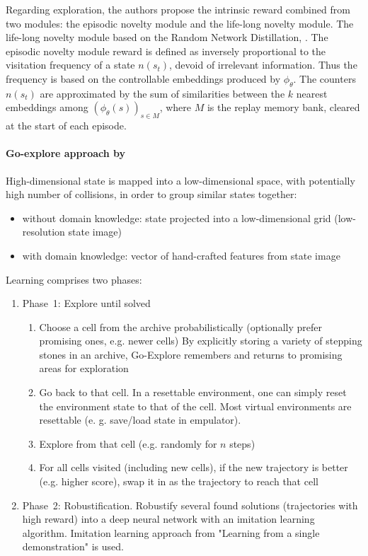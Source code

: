 \documentclass[acmsmall, nonacm]{acmart}
\begin{document}
Regarding exploration, the authors propose the intrinsic reward combined from two modules: the episodic novelty module and the life-long novelty module.
%
The life-long novelty module based on the Random Network Distillation, \citep{burda_exploration_2019}.
%
The episodic novelty module reward is defined as inversely proportional to the visitation frequency of a state $n(s_t)$, devoid of irrelevant information. Thus the frequency is based on the controllable embeddings produced by $\phi_\theta$.
The counters $n(s_t)$ are approximated by the sum of similarities between the $k$ nearest embeddings among  $(\phi_\theta(s))_{s\in M}$, where $M$ is the replay memory bank, cleared at the start of each episode.


\paragraph{Go-explore approach by~\citet{ecoffet_first_2021}} %
\label{par:go-explore}

High-dimensional state is mapped into a low-dimensional space, with potentially high number of collisions, in order to group similar states together:
\begin{itemize}
    \item without domain knowledge: state projected into a low-dimensional grid (low-resolution state image)
    \item with domain knowledge: vector of hand-crafted features from state image
\end{itemize}

Learning comprises two phases:
\begin{enumerate}
    \item Phase~1: Explore until solved
    \begin{enumerate}
      \item Choose a cell from the archive probabilistically (optionally prefer promising ones, e.g. newer cells)
    By explicitly storing a variety of stepping stones in an archive, Go-Explore remembers and returns to promising areas for exploration
      \item Go back to that cell. In a resettable environment, one can simply reset the environment state to that of the cell. Most virtual environments are resettable (e. g. save/load state in empulator).
      \item Explore from that cell (e.g. randomly for $n$ steps)
      \item For all cells visited (including new cells), if the new trajectory is better (e.g. higher score), swap it in as the trajectory to reach that cell
    \end{enumerate}

    \item Phase~2: Robustification. Robustify several found solutions (trajectories with high reward) into a deep neural network with an imitation learning algorithm. Imitation learning approach from "Learning from a single demonstration" is used.
\end{enumerate}
\end{document}
